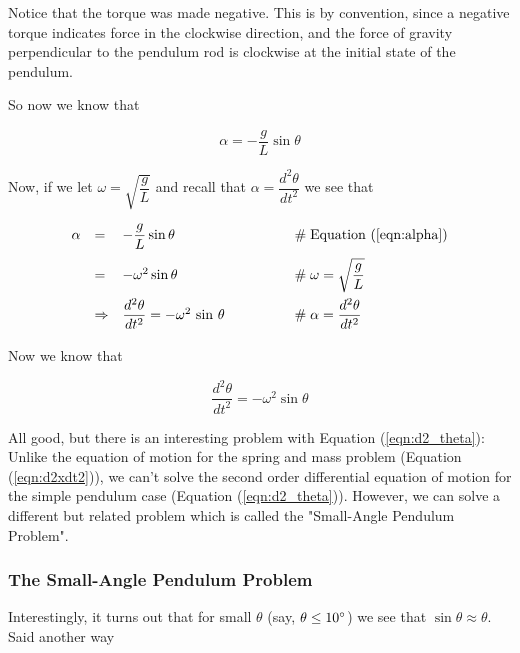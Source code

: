 \documentclass{article}
\theoremstyle{definition}
\begin{document}
\bigskip
\noindent
Notice that the torque was made negative. This is by convention,
since a negative torque indicates force in the clockwise
direction, and the force of gravity perpendicular to the pendulum
rod is clockwise at the initial state of the pendulum.

\bigskip
\noindent
So now we know that

\begin{equation}
\alpha = - \dfrac{g}{L} \sin \theta	
\label{eqn:alpha}
\end{equation}

\bigskip
\noindent
Now, if we let $\omega = \sqrt{\dfrac{g}{L}}$ and
recall that $\alpha = \dfrac{d^2 \theta}{dt^2}$
we see that 

\smallskip
\begin{equation*}
\begin{array}{llll}
\alpha
&=& - \dfrac{g}{L} \sin \theta                                          
		&\qquad \qquad \mathrel{\#} \text{Equation (\ref{eqn:alpha})} \\
[10pt]
&=& - \omega^2 \sin \theta                                              
		&\qquad \qquad \mathrel{\#} \omega = \sqrt{\dfrac{g}{L}} \\
[10pt]
&\Rightarrow& \dfrac{d^2 \theta}{dt^2} = - \omega^2 \, \sin \,\theta    
		&\qquad \qquad \mathrel{\#} \alpha = \dfrac{d^2 \theta}{dt^2} \\
[5pt]
\end{array}
\end{equation*}

\bigskip
\noindent
Now we know that

\begin{equation}
\dfrac{d^2 \theta}{dt^2} = - \omega^2 \sin \theta
\label{eqn:d2_theta}
\end{equation}

\bigskip
\noindent
All good, but there is an interesting problem with Equation 
(\ref{eqn:d2_theta}): Unlike the equation of motion for the 
spring and mass problem (Equation (\ref{eqn:d2xdt2})), we 
can't solve the second order differential equation of motion 
for the simple pendulum case (Equation (\ref{eqn:d2_theta})). 
However, we can solve a different but related problem which 
is called the "Small-Angle Pendulum Problem".

\subsubsection{The Small-Angle Pendulum Problem}
Interestingly, it turns out that for small $\theta$ (say, $\theta
\leq 10\degree$) we see that $\sin \theta \approx \theta$. Said
another way
\end{document}
